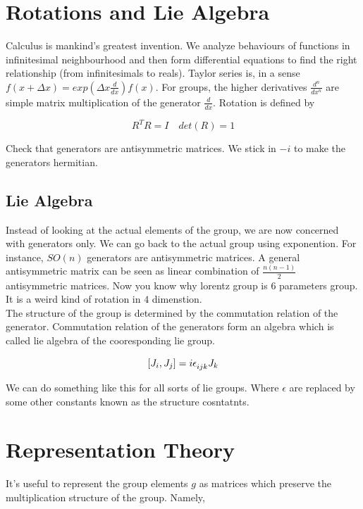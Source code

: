 \documentclass{report}
\begin{document}
\section{Rotations and Lie Algebra}

Calculus is mankind's greatest invention. We analyze behaviours of functions in infinitesimal neighbourhood and then form differential equations to find the right relationship (from infinitesimals to reals). Taylor series is, in a sense $f(x+\Delta x) = exp(\Delta x\frac{d}{dx})f(x)$. For groups, the higher derivatives $\frac{d^n}{dx^n}$ are simple matrix multiplication of the generator $\frac{d}{dx}$. Rotation is defined by

$$R^{T}R = I \quad det(R) = 1$$

\noindent Check that generators are antisymmetric matrices. We stick in $-i$ to make the generators hermitian.

\subsection{Lie Algebra}

Instead of looking at the actual elements of the group, we are now concerned with generators only. We can go back to the actual group using exponention. For instance, $SO(n)$ generators are antisymmetric matrices. A general antisymmetric matrix can be seen as linear combination of $\frac{n(n-1)}{2}$ antisymmetric matrices. Now you know why lorentz group is $6$ parameters group. It is a weird kind of rotation in $4$ dimenstion.\\

\noindent The structure of the group is determined by the commutation relation of the generator. Commutation relation of the generators form an algebra which is called lie algebra of the cooresponding lie group.

$$[J_i, J_j] = i\epsilon\indices{_i_j_k}J_k$$

\noindent We can do something like this for all sorts of lie groups. Where $\epsilon$ are replaced by some other constants known as the structure cosntatnts.

\section{Representation Theory}

It's useful to represent the group elements $g$ as matrices which preserve the multiplication structure of the group. Namely,
\end{document}
